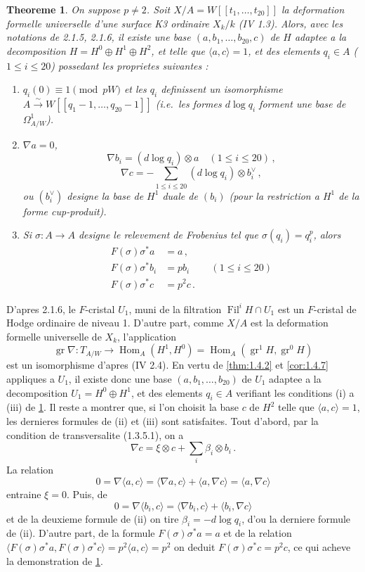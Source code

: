 \documentclass[12pt,a4paper]{article}
\theoremstyle{plain}
\newtheorem{theorem}{Theoreme}[section]
\theoremstyle{definition}
\theoremstyle{remark}
\DeclareMathOperator{\Hom}{Hom}
\DeclareMathOperator{\gr}{gr}
\DeclareMathOperator{\Fil}{Fil}
\begin{document}
\begin{theorem}\label{thm:2.1.7}
On suppose $p \neq 2$. Soit $X/A = W[[t_1, \ldots, t_{20}]]$ la deformation formelle universelle d'une surface K3 ordinaire $X_k/k$ (IV 1.3). Alors, avec les notations de 2.1.5, 2.1.6, il existe une base $(a, b_1, \ldots, b_{20}, c)$ de $H$ adaptee a la decomposition $H = H^0 \oplus H^1 \oplus H^2$, et telle que $\langle a, c \rangle = 1$, et des elements $q_i \in A$ ($1 \leq i \leq 20$) possedant les proprietes suivantes :
\begin{enumerate}[label=(\roman*)]
\item $q_i(0) \equiv 1 \pmod{pW}$ et les $q_i$ definissent un isomorphisme $A \xrightarrow{\sim} W[[q_1 - 1, \ldots, q_{20} - 1]]$ (i.e.\ les formes $d\log q_i$ forment une base de $\Omega^1_{A/W}$).
\item $\nabla a = 0$,
\[
\nabla b_i = (d\log q_i) \otimes a \quad (1 \leq i \leq 20)\,,
\]
\[
\nabla c = -\sum_{1 \leq i \leq 20} (d\log q_i) \otimes b_i^\vee\,,
\]
ou $(b_i^\vee)$ designe la base de $H^1$ duale de $(b_i)$ (pour la restriction a $H^1$ de la forme cup-produit).
\item Si $\sigma : A \to A$ designe le relevement de Frobenius tel que $\sigma(q_i) = q_i^p$, alors
\[
\begin{aligned}
F(\sigma)\sigma^*a &= a\,,\\
F(\sigma)\sigma^*b_i &= pb_i && (1 \leq i \leq 20)\\
F(\sigma)\sigma^*c &= p^2c\,.\end{aligned}
\]
\end{enumerate}
\end{theorem}

D'apres 2.1.6, le $F$-cristal $U_1$, muni de la filtration $\Fil^iH \cap U_1$ est un $F$-cristal de Hodge ordinaire de niveau 1. D'autre part, comme $X/A$ est la deformation formelle universelle de $X_k$, l'application
\[
\gr\nabla : T_{A/W} \longrightarrow \Hom_A(H^1, H^0) = \Hom_A(\gr^1H, \gr^0H)
\]
est un isomorphisme d'apres (IV 2.4). En vertu de \ref{thm:1.4.2} et \ref{cor:1.4.7} appliques a $U_1$, il existe donc une base $(a, b_1, \ldots, b_{20})$ de $U_1$ adaptee a la decomposition $U_1 = H^0 \oplus H^1$, et des elements $q_i \in A$ verifiant les conditions (i) a (iii) de \ref{thm:2.1.7}. Il reste a montrer que, si l'on choisit la base $c$ de $H^2$ telle que $\langle a, c \rangle = 1$, les dernieres formules de (ii) et (iii) sont satisfaites. Tout d'abord, par la condition de transversalite (1.3.5.1), on a
\[
\nabla c = \xi \otimes c + \sum_i \beta_i \otimes b_i\,.\]
La relation
\[
0 = \nabla\langle a, c\rangle = \langle\nabla a, c\rangle + \langle a, \nabla c\rangle = \langle a, \nabla c\rangle
\]
entraine $\xi = 0$. Puis, de
\[
0 = \nabla\langle b_i, c\rangle = \langle\nabla b_i, c\rangle + \langle b_i, \nabla c\rangle
\]
et de la deuxieme formule de (ii) on tire $\beta_i = -d\log q_i$, d'ou la derniere formule de (ii). D'autre part, de la formule $F(\sigma)\sigma^*a = a$ et de la relation $\langle F(\sigma)\sigma^*a, F(\sigma)\sigma^*c\rangle = p^2\langle a, c\rangle = p^2$ on deduit $F(\sigma)\sigma^*c = p^2c$, ce qui acheve la demonstration de \ref{thm:2.1.7}.
\end{document}
